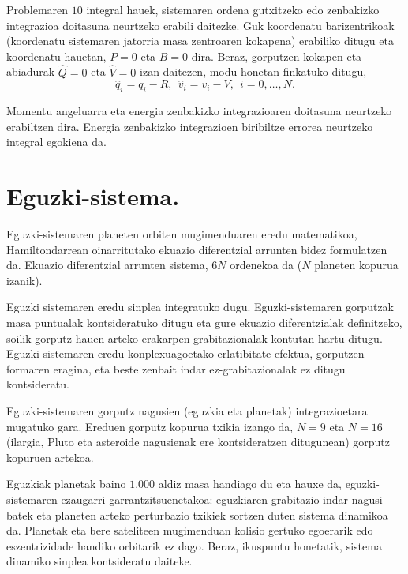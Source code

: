 Problemaren $10$ integral hauek, sistemaren ordena gutxitzeko edo zenbakizko integrazioa doitasuna neurtzeko erabili daitezke. Guk koordenatu barizentrikoak (koordenatu sistemaren jatorria masa zentroaren kokapena) erabiliko ditugu eta koordenatu hauetan, $P=0$ eta $B=0$ dira. Beraz, gorputzen kokapen eta abiadurak $\hat{Q}=0$ eta $\hat{V}=0$ izan daitezen, modu honetan finkatuko ditugu,
\begin{equation*}
\hat{q}_i=q_i-R, \ \  \hat{v}_i=v_i-V, \ \ i=0,\dots,N.
\end{equation*}

Momentu angeluarra eta energia zenbakizko integrazioaren doitasuna neurtzeko erabiltzen dira. Energia zenbakizko integrazioen biribiltze errorea neurtzeko integral egokiena da.

\section{Eguzki-sistema.}

Eguzki-sistemaren planeten orbiten mugimenduaren eredu matematikoa, Hamiltondarrean oinarritutako ekuazio diferentzial arrunten bidez formulatzen da. Ekuazio diferentzial arrunten sistema, $6N$ ordenekoa da ($N$ planeten kopurua izanik).

Eguzki sistemaren eredu sinplea integratuko dugu. Eguzki-sistemaren gorputzak masa puntualak kontsideratuko ditugu eta gure ekuazio diferentzialak definitzeko, soilik gorputz hauen arteko erakarpen grabitazionalak kontutan hartu ditugu. Eguzki-sistemaren eredu konplexuagoetako erlatibitate efektua, gorputzen formaren eragina, eta beste zenbait indar ez-grabitazionalak ez ditugu kontsideratu.

Eguzki-sistemaren gorputz nagusien (eguzkia eta planetak) integrazioetara mugatuko gara. Ereduen gorputz kopurua txikia izango da, $N=9$ eta $N=16$ (ilargia, Pluto eta asteroide nagusienak ere kontsideratzen ditugunean) gorputz kopuruen artekoa.

Eguzkiak planetak baino $1.000$ aldiz masa handiago du eta hauxe da, eguzki-sistemaren ezaugarri garrantzitsuenetakoa: eguzkiaren grabitazio indar nagusi batek eta planeten arteko perturbazio txikiek sortzen duten sistema dinamikoa da. Planetak eta bere sateliteen mugimenduan kolisio gertuko egoerarik edo eszentrizidade handiko orbitarik ez dago. Beraz, ikuspuntu honetatik, sistema dinamiko sinplea kontsideratu daiteke.  

